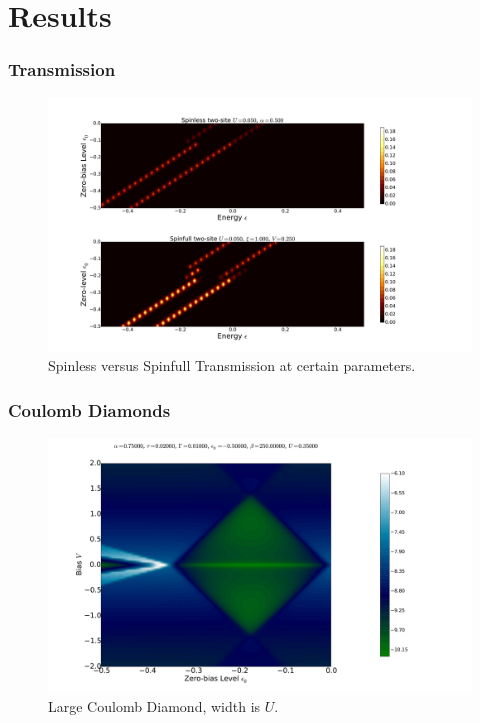 \section{Results}
\begin{frame}
    \frametitle{Transmission}
    \vspace{-3mm}
    \begin{figure}[!b] 
        \centering
        \includegraphics[height=.85\textheight, width=\textwidth,clip=true, trim=0cm 0cm 5cm 2cm]{res/transmap_u1_k2.pdf}
        \vspace{-6mm}
        \caption{Spinless versus Spinfull Transmission at certain parameters.}
    \end{figure} 
\end{frame}
\begin{frame}
    \frametitle{Coulomb Diamonds}
    \vspace{-3mm}
    \begin{figure}[!b] 
        \centering
        \includegraphics[height=.85\textheight, width=\textwidth]{res/current_map_diamond_alpha_075.pdf}
        \vspace{-6mm}
        \caption{Large Coulomb Diamond, width is $U$.}
    \end{figure} 
\end{frame}
